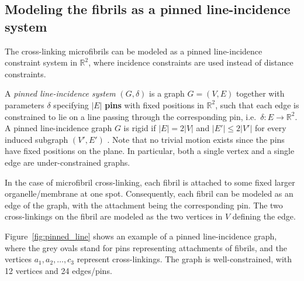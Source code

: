 \subsection{Modeling the fibrils as a pinned line-incidence system}



The cross-linking  microfibrils can be modeled as a pinned line-incidence constraint system in $\mathbb{R}^2$,
where incidence constraints are used instead of distance constraints.

A {\em pinned line-incidence system} $(G,\delta)$  
is a graph $G=(V,E)$ together with parameters $\delta$ specifying $|E|$ \textbf{pins} with fixed positions in $\mathbb{R}^2$, 
such that each edge is constrained to lie on a line passing through 
the corresponding pin, i.e.\ $\delta: E \rightarrow \mathbb{R}^2$.
%
%
A pinned line-incidence graph $G$ is rigid if $|E| = 2|V|$ and $|E'| \le 2|V'|$ for every induced subgraph $(V',E')$  \cite{xxx}. Note that no trivial motion exists since the pins have fixed positions on the plane.
In particular, both a single vertex and a single edge are under-constrained graphs.




In the case of microfibril cross-linking, each fibril is
attached to some fixed larger organelle/membrane at one spot.
Consequently, each fibril can be modeled as an edge of the graph,
with the attachment being the corresponding pin.
The two cross-linkings on the fibril are modeled as the two vertices in $V$ defining the edge.



Figure~\ref{fig:pinned_line} shows an example of a  pinned line-incidence graph,
where the grey ovals stand for pins representing attachments of fibrils,
and the vertices $a_1,a_2,\ldots, c_3$ represent cross-linkings.
The graph is well-constrained, with 12 vertices and 24 edges/pins.

